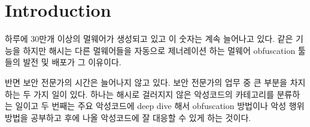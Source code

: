 \section{Introduction}
%




하루에 30만개 이상의 멀웨어가 생성되고 있고 이 숫자는 계속 늘어나고 있다. %
같은 기능을 하지만 해시는 다른 멀웨어들을 자동으로 제너레이션 하는 멀웨어 obfuscation 툴들의 발전 및 배포가 그 이유이다. 

반면 보안 전문가의 시간은 늘어나지 않고 있다. 보안 전문가의 업무 중 큰 부분을 차지하는 두 가지 일이 있다. 하나는 해시로 걸러지지 않은 악성코드의 카테고리를 분류하는 일이고 두 번째는 주요 악성코드에 deep dive 해서 obfuscation 방법이나 악성 행위 방법을 공부하고 후에 나올 악성코드에 잘 대응할 수 있게 하는 것이다.   

